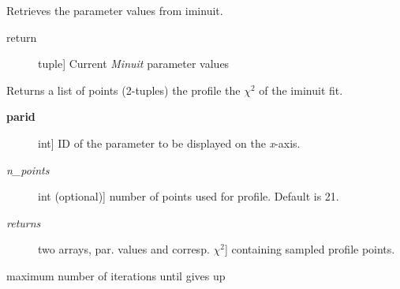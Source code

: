 \documentclass[a4paper,10pt,english]{sphinxmanual}
\begin{document}
\begin{fulllineitems}
\begin{fulllineitems}
\begin{description}
\end{description}

\end{fulllineitems}


\begin{fulllineitems}
\label{index:kafe.iminuit_wrapper.IMinuit.get_parameter_values}
Retrieves the parameter values from iminuit.
\begin{description}
\item[{return}] \leavevmode{[}tuple{]}
Current \emph{Minuit} parameter values

\end{description}

\end{fulllineitems}


\begin{fulllineitems}
\label{index:kafe.iminuit_wrapper.IMinuit.get_profile}
Returns a list of points (2-tuples) the profile
the \(\chi^2\)  of the iminuit fit.
\begin{description}
\item[{\textbf{parid}}] \leavevmode{[}int{]}
ID of the parameter to be displayed on the \emph{x}-axis.

\item[{\emph{n\_points}}] \leavevmode{[}int (optional){]}
number of points used for profile. Default is 21.

\item[{\emph{returns}}] \leavevmode{[}two arrays, par. values and corresp. \(\chi^2\){]}
containing  sampled profile points.

\end{description}

\end{fulllineitems}


\begin{fulllineitems}
\label{index:kafe.iminuit_wrapper.IMinuit.max_iterations}
maximum number of iterations until  gives up


\end{fulllineitems}
\end{fulllineitems}
\end{document}

